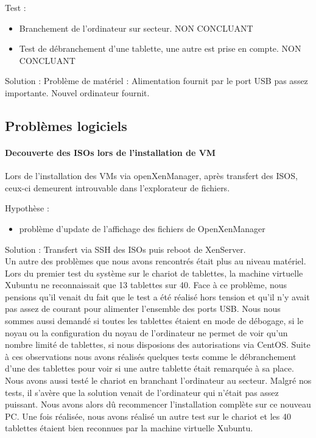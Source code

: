 \documentclass[a4paper,12pt]{extarticle}
\begin{document}
Test :
\begin{itemize}
\item Branchement de l'ordinateur sur secteur. NON CONCLUANT
\item Test de débranchement d'une tablette, une autre est prise en compte. NON CONCLUANT \\
\end{itemize}

Solution :
Problème de matériel : Alimentation fournit par le port USB pas assez importante. 
Nouvel ordinateur fournit.



\subsection{Problèmes logiciels}


\paragraph{Decouverte des ISOs lors de l'installation de VM\\}
Lors de l'installation des VMs via openXenManager, après transfert des ISOS, ceux-ci demeurent introuvable dans l'explorateur de fichiers.

Hypothèse :
\begin{itemize}
\item problème d'update de l'affichage des fichiers de OpenXenManager\\
\end{itemize}

Solution :
Transfert via SSH des ISOs puis reboot de XenServer.\\



Un autre des problèmes que nous avons rencontrés était plus au niveau matériel. Lors du premier test du système sur le chariot de tablettes, la machine virtuelle Xubuntu ne reconnaissait que 13 tablettes sur 40. Face à ce problème, nous pensions qu’il venait du fait que le test a été réalisé hors tension et qu’il n’y avait pas assez de courant pour alimenter l’ensemble des ports USB.\newline
Nous nous sommes aussi demandé si toutes les tablettes étaient en mode de débogage, si le noyau ou la configuration du noyau de l’ordinateur ne permet de voir qu’un nombre limité de tablettes, si nous disposions des autorisations via CentOS. Suite à ces observations nous avons réalisés quelques tests comme le débranchement d’une des tablettes pour voir si une autre tablette était remarquée à sa place. Nous avons aussi testé le chariot en branchant l’ordinateur au secteur. Malgré nos tests, il s'avère que la solution venait de l’ordinateur qui n’était pas assez puissant.\newline
Nous avons alors dû recommencer l’installation complète sur ce nouveau PC. Une fois réalisée, nous avons réalisé un autre test sur le chariot et les 40 tablettes étaient bien reconnues par la machine virtuelle Xubuntu.
\end{document}
